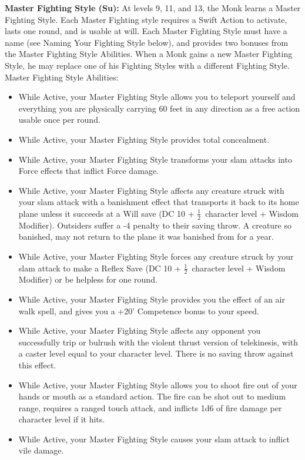 \documentclass[10pt]{article}
\newcommand{\ability}[2]{\smallskip \noindent \textbf{#1} #2}
\newcommand{\itemspace}[0]{\setlength{\itemsep}{-1mm}}
\newcommand{\half}[0]{\ensuremath{\frac{1}{2}}}
\begin{document}
\ability{Master Fighting Style (Su):}{At levels 9, 11, and 13, the Monk learns a Master Fighting Style. Each Master Fighting style requires a Swift Action to activate, lasts one round, and is usable at will. Each Master Fighting Style must have a name (see Naming Your Fighting Style below), and provides two bonuses from the Master Fighting Style Abilities. When a Monk gains a new Master Fighting Style, he may replace one of his Fighting Styles with a different Fighting Style.}
Master Fighting Style Abilities:
\begin{itemize}\itemspace
    \item While Active, your Master Fighting Style allows you to teleport yourself and everything you are physically carrying 60 feet in any direction as a free action usable once per round.
    \item While Active, your Master Fighting Style provides total concealment.
    \item While Active, your Master Fighting Style transforms your slam attacks into Force effects that inflict Force damage.
    \item While Active, your Master Fighting Style affects any creature struck with your slam attack with a banishment effect that transports it back to its home plane unless it succeeds at a Will save (DC 10 + \half\  character level + Wisdom Modifier). Outsiders suffer a -4 penalty to their saving throw. A creature so banished, may not return to the plane it was banished from for a year.
    \item While Active, your Master Fighting Style forces any creature struck by your slam attack to make a Reflex Save (DC 10 + \half\  character level + Wisdom Modifier) or be helpless for one round.
    \item While Active, your Master Fighting Style provides you the effect of an air walk spell, and gives you a +20' Competence bonus to your speed.
    \item While Active, your Master Fighting Style affects any opponent you successfully trip or bulrush with the violent thrust version of telekinesis, with a caster level equal to your character level. There is no saving throw against this effect.
    \item While Active, your Master Fighting Style allows you to shoot fire out of your hands or mouth as a standard action. The fire can be shot out to medium range, requires a ranged touch attack, and inflicts 1d6 of fire damage per character level if it hits.
    \item While Active, your Master Fighting Style causes your slam attack to inflict vile damage.

\end{itemize}
\end{document}
